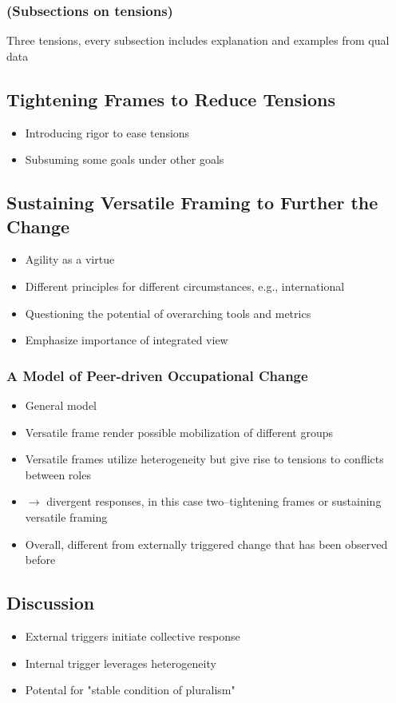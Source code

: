 \documentclass{article}
\begin{document}
	\subsubsection*{(Subsections on tensions)}
	Three tensions, every subsection includes explanation and examples from qual data
	
	\subsection*{Tightening Frames to Reduce Tensions}
	\begin{itemize}
		\item Introducing rigor to ease tensions
		\item Subsuming some goals under other goals
	\end{itemize}

	\subsection*{Sustaining Versatile Framing to Further the Change}
	\begin{itemize}
		\item Agility as a virtue
		\item Different principles for different circumstances, e.g., international
		\item Questioning the potential of overarching tools and metrics
		\item Emphasize importance of integrated view
	\end{itemize}
		
	\subsubsection*{A Model of Peer-driven Occupational Change}
	\begin{itemize}
		\item General model
		\item Versatile frame render possible mobilization of different groups
		\item Versatile frames utilize heterogeneity but give rise to tensions to conflicts between roles
		\item $\rightarrow$ divergent responses, in this case two--tightening frames or sustaining versatile framing
		\item Overall, different from externally triggered change that has been observed before
	\end{itemize}
	
	\subsection*{Discussion}
	\begin{itemize}
		\item External triggers initiate collective response
		\item Internal trigger leverages heterogeneity
		\item Potental for "stable condition of pluralism"
	\end{itemize}
	
\end{document}
